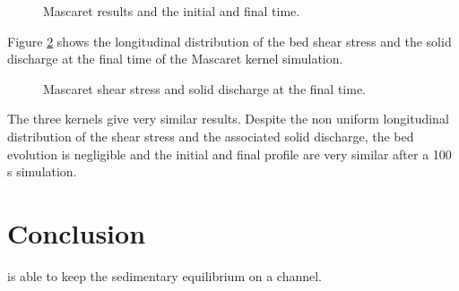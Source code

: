 \begin{figure}[h]
 \centering
 \caption{Mascaret results and the initial and final time.}
 \label{fig:profile_mascaret}
\end{figure}

Figure \ref{fig:tauqs_mascaret} shows the longitudinal distribution of the
bed shear stress and the solid discharge at the final time of the Mascaret
kernel simulation.

\begin{figure}[h]
 \centering
 \caption{Mascaret shear stress and solid discharge at the final time.}
 \label{fig:tauqs_mascaret}
\end{figure}

The three kernels give very similar results. Despite the non uniform
longitudinal distribution of the shear stress and the associated 
solid discharge, the bed evolution is negligible and the initial and
final profile are very similar after a 100 s simulation.

\section{Conclusion}

\courlis is able to keep the sedimentary equilibrium on a channel.


